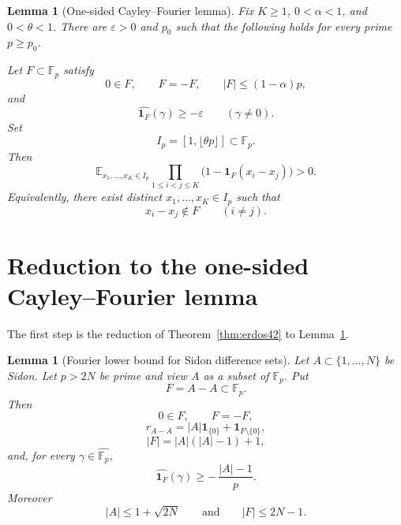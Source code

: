 \documentclass[11pt]{article}
\numberwithin{equation}{section}
\newtheorem{lemma}[theorem]{Lemma}
\newcommand{\E}{\mathbb E}
\newcommand{\F}{\mathbb F}
\newcommand{\1}{\mathbf 1}
\begin{document}
\begin{lemma}[One-sided Cayley--Fourier lemma]
\label{lem:one-sided-cayley-fourier}
Fix \(K\ge1\), \(0<\alpha<1\), and \(0<\theta<1\).  There are
\(\varepsilon>0\) and \(p_0\) such that the following holds for every
prime \(p\ge p_0\).

Let \(F\subset\F_p\) satisfy
\[
        0\in F,\qquad F=-F,\qquad |F|\le(1-\alpha)p,
\]
and
\[
        \widehat{\1_F}(\gamma)\ge-\varepsilon
        \qquad(\gamma\ne0).
\]
Set
\[
        I_p=[1,\lfloor\theta p\rfloor]\subset\F_p.
\]
Then
\[
        \E_{x_1,\ldots,x_K\in I_p}
        \prod_{1\le i<j\le K}
        \bigl(1-\1_F(x_i-x_j)\bigr)>0.
\]
Equivalently, there exist distinct \(x_1,\ldots,x_K\in I_p\) such that
\[
        x_i-x_j\notin F
        \qquad(i\ne j).
\]
\end{lemma}

\section{Reduction to the one-sided Cayley--Fourier lemma}

The first step is the reduction of Theorem~\ref{thm:erdos42} to
Lemma~\ref{lem:one-sided-cayley-fourier}.

\begin{lemma}[Fourier lower bound for Sidon difference sets]
\label{lem:sidon-fourier-lower}
Let \(A\subset\{1,\ldots,N\}\) be Sidon.  Let \(p>2N\) be prime and view
\(A\) as a subset of \(\F_p\).  Put
\[
        F=A-A\subset\F_p.
\]
Then
\[
        0\in F,\qquad F=-F,
\]
\[
        r_{A-A}=|A|\1_{\{0\}}+\1_{F\setminus\{0\}},
\]
\[
        |F|=|A|(|A|-1)+1,
\]
and, for every \(\gamma\in\widehat{\F_p}\),
\[
        \widehat{\1_F}(\gamma)
        \ge
        -\,\frac{|A|-1}{p}.
\]
Moreover
\[
        |A|\le 1+\sqrt{2N}
        \qquad\text{and}\qquad
        |F|\le 2N-1.
\]
\end{lemma}
\end{document}
